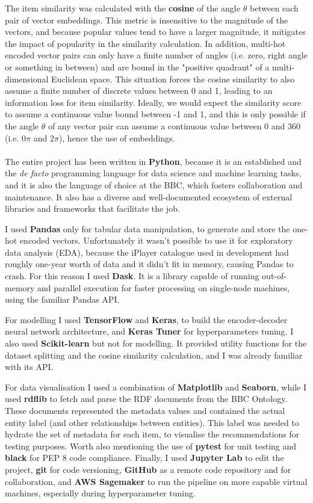 The item similarity was calculated with the \textbf{cosine} of the angle $\theta$ between each pair of vector embeddings. This metric
is insensitive to the magnitude of the vectors, and because popular values tend to have a larger magnitude, it mitigates the impact of
popularity in the similarity calculation. In addition, multi-hot encoded vector pairs can only have a finite number of angles
(i.e. zero, right angle or something in between) and are bound in the "positive quadrant" of a multi-dimensional Euclidean space.
This situation forces the cosine similarity to also assume a finite number of discrete values between 0 and 1, leading to an information
loss for item similarity. Ideally, we would expect the similarity score to assume a continuous value bound between -1 and 1, and this
is only possible if the angle $\theta$ of any vector pair can assume a continuous value between 0 and 360 (i.e. $0\pi$ and $2\pi$), hence
the use of embeddings.
\\ \\
The entire project has been written in \textbf{Python}, because it is an established and the \textit{de facto} programming language for data science
and machine learning tasks, and it is also the language of choice at the BBC, which fosters collaboration and maintenance.
It also has a diverse and well-documented ecosystem of external libraries and frameworks that facilitate the job.

I used \textbf{Pandas} only for tabular data manipulation, to generate and store the one-hot encoded vectors. Unfortunately it wasn't possible
to use it for exploratory data analysis (EDA), because the iPlayer catalogue used in development had roughly one-year worth of data and it didn't
fit in memory, causing Pandas to crash. For this reason I used \textbf{Dask}. It is a library capable of running out-of-memory and
parallel execution for faster processing on single-node machines, using the familiar Pandas API.

For modelling I used \textbf{TensorFlow} and \textbf{Keras}, to build the encoder-decoder neural network architecture, and \textbf{Keras Tuner} for
hyperparameters tuning. I also used \textbf{Scikit-learn} but not for modelling. It provided utility functions for the dataset splitting and
the cosine similarity calculation, and I was already familiar with its API.

For data visualisation I used a combination of \textbf{Matplotlib} and \textbf{Seaborn}, while I used \textbf{rdflib} to fetch and parse
the RDF documents from the BBC Ontology. These documents represented the metadata values and contained the actual entity label (and other
relationships between entities).
This label was needed to hydrate the set of metadata for each item, to visualise the recommendations for testing purposes.
Worth also mentioning the use of \textbf{pytest} for unit testing and \textbf{black} for PEP 8 code compliance.
Finally, I used \textbf{Jupyter Lab} to edit the project, \textbf{git} for code versioning, \textbf{GitHub} as a remote code repository
and for collaboration, and \textbf{AWS Sagemaker} to run the pipeline on more capable virtual machines, especially during hyperparameter tuning.
